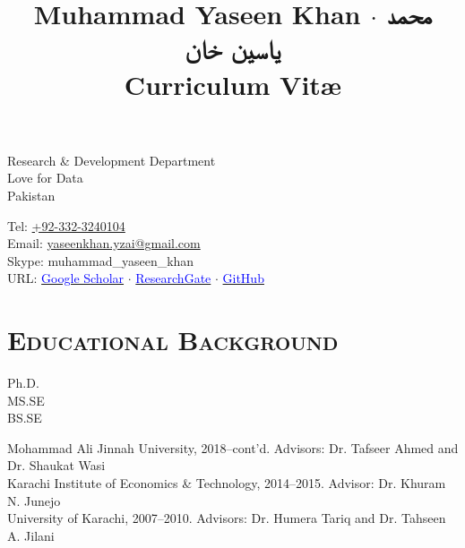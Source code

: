 \documentclass[a4paper, 10pt]{article}
\title{{\huge Muhammad Yaseen Khan}
 $\cdot$ {\huge\texturdu{محمد یاسین خان}}
\\\small Curriculum Vit\ae}
\author{}
\date{}
\begin{document}
\maketitle
\vspace{-3em}
\begin{minipage}{0.45\textwidth}
Research \& Development Department\\
Love for Data\\
Pakistan\\
\hfill
\end{minipage}
\hfill
\begin{minipage}{0.45\textwidth}
Tel: \href{tel:+923323240104}{+92-332-3240104}\\
Email: \href{mailto:yaseenkhan.yzai@gmail.com}{yaseenkhan.yzai@gmail.com}\\
Skype: muhammad\_yaseen\_khan\\
URL: \href{https://scholar.google.com/citations?user=a_d2KTEAAAAJ&hl=en}{\textcolor{blue}{Google Scholar}} $\cdot$ \href{https://www.researchgate.net/profile/Muhammad_Yaseen_Khan}{\textcolor{blue}{ResearchGate}} $\cdot$ \href{https://www.github.com/MuhammadYaseenKhan}{\textcolor{blue}{GitHub}}
\end{minipage}


\section*{\normalfont\textsc{Educational Background}}
\hfill\begin{minipage}{0.085\textwidth}
Ph.D.\\
MS.SE\\
BS.SE
\end{minipage}%
\begin{minipage}{0.95\textwidth}
Mohammad Ali Jinnah University, 2018--cont'd. 
Advisors: Dr. Tafseer Ahmed and Dr. Shaukat Wasi\\
Karachi Institute of Economics \& Technology, 2014--2015. Advisor: Dr. Khuram N. Junejo\\
University of Karachi, 2007--2010. Advisors: Dr. Humera Tariq and Dr. Tahseen A. Jilani
\end{minipage}


\end{document}
